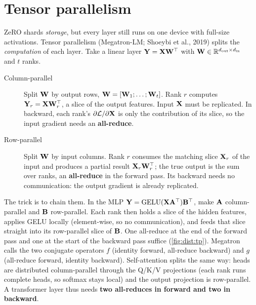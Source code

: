 \section{Tensor parallelism}\label{sec:dist:tp}

ZeRO shards \emph{storage}, but every layer still runs on one device with full-size
activations. Tensor parallelism (Megatron-LM; Shoeybi et al., 2019) splits the
\emph{computation} of each layer. Take a linear layer $\mathbf{Y}=\mathbf{X}\mathbf{W}^\top$ with
$\mathbf{W}\in\mathbb{R}^{d_{\text{out}}\times d_{\text{in}}}$ and $t$ ranks.

\begin{description}
\item[Column-parallel] Split $\mathbf{W}$ by output rows, $\mathbf{W}=[\mathbf{W}_1;\dots;\mathbf{W}_t]$. Rank
  $r$ computes $\mathbf{Y}_r=\mathbf{X}\mathbf{W}_r^\top$, a slice of the output features. Input $\mathbf{X}$ must
  be replicated. In backward, each rank's $\partial\mathcal L/\partial\mathbf{X}$ is only the
  contribution of its slice, so the input gradient needs an \textbf{all-reduce}.
\item[Row-parallel] Split $\mathbf{W}$ by input columns. Rank $r$ consumes the matching slice
  $\mathbf{X}_r$ of the input and produces a partial result $\mathbf{X}_r\mathbf{W}_r^\top$; the true output is
  the sum over ranks, an \textbf{all-reduce} in the forward pass. Its backward needs no
  communication: the output gradient is already replicated.
\end{description}

The trick is to chain them. In the MLP $\mathbf{Y}=\operatorname{GELU}(\mathbf{X}\mathbf{A}^\top)\mathbf{B}^\top$, make $\mathbf{A}$
column-parallel and $\mathbf{B}$ row-parallel. Each rank then holds a slice of the hidden features,
applies GELU locally (element-wise, so no communication), and feeds that slice straight into
its row-parallel slice of $\mathbf{B}$. One all-reduce at the end of the forward pass and one at the
start of the backward pass suffice (\cref{fig:dist:tp}). Megatron calls the two conjugate
operators $f$ (identity forward, all-reduce backward) and $g$ (all-reduce forward, identity
backward). Self-attention splits the same way: heads are distributed column-parallel through
the Q/K/V projections (each rank runs complete heads, so softmax stays local) and the output
projection is row-parallel. A transformer layer thus needs \textbf{two all-reduces in forward
and two in backward}.

